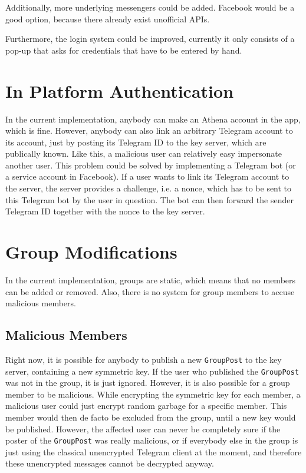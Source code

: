 \documentclass[a4paper, oneside]{discothesis}
\begin{document}
Additionally, more underlying messengers could be added. Facebook would be a good option, because there already exist unofficial APIs.

Furthermore, the login system could be improved, currently it only consists of a pop-up that asks for credentials that have to be entered by hand.

\section{In Platform Authentication}

In the current implementation, anybody can make an Athena account in the app, which is fine. However, anybody can also link an arbitrary Telegram account to its account, just by posting its Telegram ID to the key server, which are publically known. Like this, a malicious user can relatively easy impersonate another user. This problem could be solved by implementing a Telegram bot (or a service account in Facebook). If a user wants to link its Telegram account to the server, the server provides a challenge, i.e. a nonce, which has to be sent to this Telegram bot by the user in question. The bot can then forward the sender Telegram ID together with the nonce to the key server.

\section{Group Modifications}

In the current implementation, groups are static, which means that no members can be added or removed. Also, there is no system for group members to accuse malicious members.

\subsection{Malicious Members}

Right now, it is possible for anybody to publish a new \texttt{GroupPost} to the key server, containing a new symmetric key. If the user who published the \texttt{GroupPost} was not in the group, it is just ignored. However, it is also possible for a group member to be malicious. While encrypting the symmetric key for each member, a malicious user could just encrypt random garbage for a specific member. This member would then de facto be excluded from the group, until a new key would be published. However, the affected user can never be completely sure if the poster of the \texttt{GroupPost} was really malicious, or if everybody else in the group is just using the classical unencrypted Telegram client at the moment, and therefore these unencrypted messages cannot be decrypted anyway.
\end{document}
